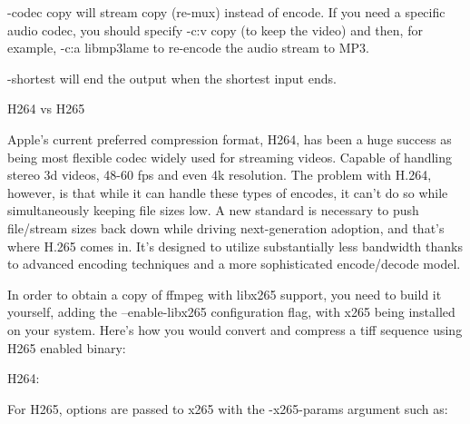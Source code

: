 \begin{fullwidth}
-codec copy will stream copy (re-mux) instead of encode. If you need a specific audio codec, you should specify -c:v copy (to keep the video) and then, for example, -c:a libmp3lame to re-encode the audio stream to MP3.

-shortest will end the output when the shortest input ends.

{\large H264 vs H265 \par}

Apple’s current preferred compression format, H264, has been a huge success as being most flexible codec widely used for streaming videos. Capable of handling stereo 3d videos, 48-60 fps and even 4k resolution.  The problem with H.264, however, is that while it can handle these types of encodes, it can’t do so while simultaneously keeping file sizes low. A new standard is necessary to push file/stream sizes back down while driving next-generation adoption, and that’s where H.265 comes in. It’s designed to utilize substantially less bandwidth thanks to advanced encoding techniques and a more sophisticated encode/decode model.

In order to obtain a copy of ffmpeg with libx265 support, you need to build it yourself, adding the --enable-libx265 configuration flag, with x265 being installed on your system. Here’s how you would convert and compress a tiff sequence using H265 enabled binary:

H264:


For H265, options are passed to x265 with the -x265-params argument such as:



\clearpage
\end{fullwidth}